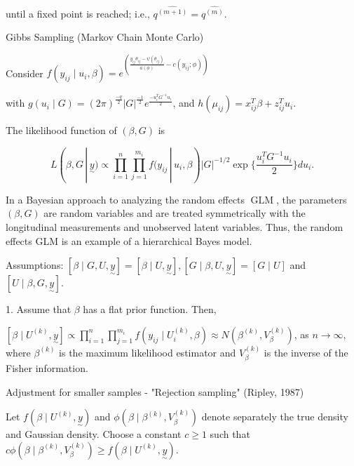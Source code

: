 \documentclass[UTF8,a4paper,10pt]{article}
\begin{document}
until a fixed point is reached; i.e., \(q^{\hat{(m+1)}} = q^{\hat{(m)}}\).

  

\dotfill

Gibbs Sampling (Markov Chain Monte Carlo)



Consider $f\left(y_{i j} \mid u_{i}, \beta\right)=e^{\left(\frac{y_{i j} \theta_{i j}-\psi\left(\theta_{i j}\right)}{a(\phi)}-c\left(y_{i j} ; \phi\right)\right)}$ 

with $g\left(u_{i} \mid G\right)=(2 \pi)^{\frac{-q}{2}}|G|^{\frac{-1}{2}} e^{\frac{-u_{i}^{T} G^{-1} u_{i}}{2}}$, and $h\left(\mu_{i j}\right)=x_{i j}^{T} \beta+z_{i j}^{T} u_{i}$.

The likelihood function of $(\beta, G)$ is

\[L(\beta, G\,|\,  \underset{\sim}{y})\propto \prod_{i=1}^n\prod_{j=1}^{m_i}f(y_{ij}\,|\,u_i,\beta)|G|^{-1/2}\exp\{\frac{u_i^TG^{-1}u_i}{2}\}du_i. \]


In a Bayesian approach to analyzing the random effects $\operatorname{GLM}$, the parameters $(\beta, G)$ are random variables and are treated symmetrically with the longitudinal measurements and unobserved latent variables. Thus, the random effects GLM is an example of a hierarchical Bayes model.

Assumptions: $[\beta \mid G, U, \underset{\sim}{y}]=[\beta \mid U, \underset{\sim}{y}],[G \mid \beta, U, \underset{\sim}{y}]=[G \mid U]$ and $[U \mid \beta, G, \underset{\sim}{y}]$.

1. Assume that $\beta$ has a flat prior function. Then,

$\left[\beta \mid U^{(k)}, \underset{\sim}{y}\right] \propto \prod_{i=1}^{n} \prod_{j=1}^{m_{i}} f\left(y_{i j} \mid U_{i}^{(k)}, \beta\right) \approx N\left(\beta^{(k)}, V_{\beta}^{(k)}\right)$, as $n \rightarrow \infty$, where $\beta^{(k)}$ is the maximum likelihood estimator and $V_{\beta}^{(k)}$ is the inverse of the Fisher information.

Adjustment for smaller samples - "Rejection sampling" (Ripley, 1987)

Let $f\left(\beta \mid U^{(k)}, \underset{\sim}{y}\right)$ and $\phi\left(\beta \mid \beta^{(k)}, V_{\beta}^{(k)}\right)$ denote separately the true density and Gaussian density. Choose a constant $c \geq 1$ such that $c \phi\left(\beta \mid \beta^{(k)}, V_{\beta}^{(k)}\right) \geq f\left(\beta \mid U^{(k)}, \underset{\sim}{y}\right)$.
\end{document}
